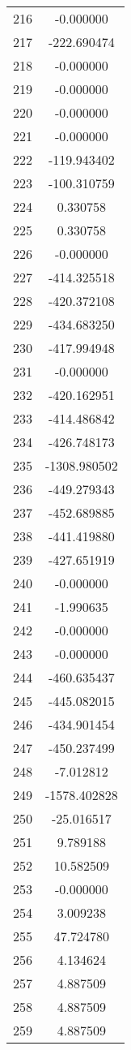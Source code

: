 \documentclass[12pt]{article}
\begin{document}
\begin{longtable}{@{}cc@{}}
216 & -0.000000 \\
217 & -222.690474 \\
218 & -0.000000 \\
219 & -0.000000 \\
220 & -0.000000 \\
221 & -0.000000 \\
222 & -119.943402 \\
223 & -100.310759 \\
224 & 0.330758 \\
225 & 0.330758 \\
226 & -0.000000 \\
227 & -414.325518 \\
228 & -420.372108 \\
229 & -434.683250 \\
230 & -417.994948 \\
231 & -0.000000 \\
232 & -420.162951 \\
233 & -414.486842 \\
234 & -426.748173 \\
235 & -1308.980502 \\
236 & -449.279343 \\
237 & -452.689885 \\
238 & -441.419880 \\
239 & -427.651919 \\
240 & -0.000000 \\
241 & -1.990635 \\
242 & -0.000000 \\
243 & -0.000000 \\
244 & -460.635437 \\
245 & -445.082015 \\
246 & -434.901454 \\
247 & -450.237499 \\
248 & -7.012812 \\
249 & -1578.402828 \\
250 & -25.016517 \\
251 & 9.789188 \\
252 & 10.582509 \\
253 & -0.000000 \\
254 & 3.009238 \\
255 & 47.724780 \\
256 & 4.134624 \\
257 & 4.887509 \\
258 & 4.887509 \\
259 & 4.887509 \\

\end{longtable}
\end{document}
